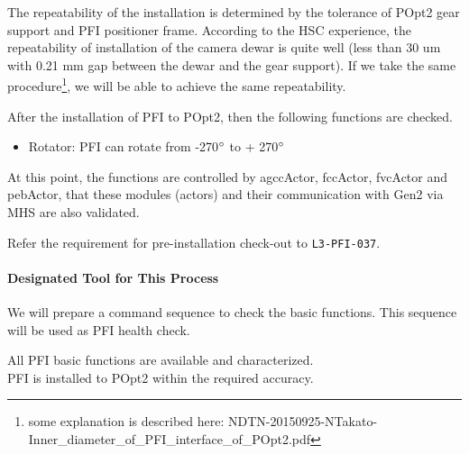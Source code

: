 The repeatability of the installation is determined by the tolerance of POpt2 gear support and PFI positioner frame.
According to the HSC experience, the repeatability of installation of the camera dewar is quite well (less than 30 um with 0.21 mm gap between the dewar and the gear support).
If we take the same procedure\footnote{some explanation is described here: NDTN-20150925-NTakato-Inner\_diameter\_of\_PFI\_interface\_of\_POpt2.pdf}, we will be able to achieve the same repeatability.

After the installation of PFI to POpt2, then the following functions are checked.
\begin{itemize}
\item Rotator: PFI can rotate from -270$^\circ$ to + 270$^\circ$
\end{itemize}

At this point, the functions are controlled by agccActor, fccActor, fvcActor and pebActor, that these modules (actors) and their communication with Gen2 via MHS are also validated.

Refer the requirement for pre-installation check-out to {\tt L3-PFI-037}.

\paragraph{Designated Tool for This Process} 
We will prepare a command sequence to check the basic functions.
This sequence will be used as PFI health check.

\begin{itembox}[l]{}
All PFI basic functions are available and characterized.\\
PFI is installed to POpt2 within the required accuracy. 

\end{itembox}